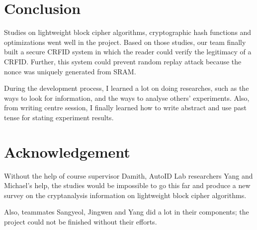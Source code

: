 \documentclass[sigconf, review=false]{acmart}
\begin{document}
\section{Conclusion}
Studies on lightweight block cipher algorithms, cryptographic hash functions and optimizations went well in the project.
Based on those studies, our team finally built a secure CRFID system in which the reader could verify the legitimacy of a CRFID.
Further, this system could prevent random replay attack because the nonce was uniquely generated from SRAM.

During the development process, I learned a lot on doing researches, such as the ways to look for information, and the ways to analyse others' experiments.
Also, from writing centre session, I finally learned how to write abstract and use past tense for stating experiment results.


\section{Acknowledgement}
Without the help of course supervisor Damith, AutoID Lab researchers Yang and Michael's help,
the studies would be impossible to go this far and produce a new survey on the cryptanalysis information on lightweight block cipher algorithms.

Also, teammates Sangyeol, Jingwen and Yang did a lot in their components; the project could not be finished without their efforts.





\end{document}
